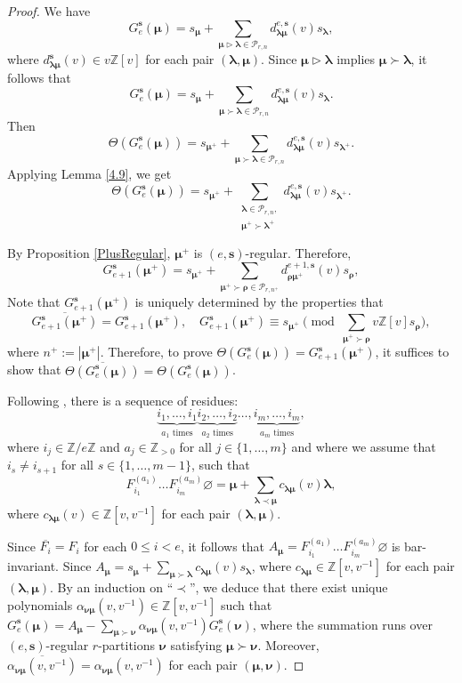 \documentclass[a4paper,10pt]{amsart}
\theoremstyle{plain}
\newcommand{\bvarnothing}{{\boldsymbol \varnothing}}
\def\bs{{\boldsymbol{s}}}
\def\Z{{\mathbb Z}}
\def\PP{\mathscr{P}}
\def\blam{{\boldsymbol \lambda}}
\def\bmu{{\boldsymbol \mu}}
\def\brho{{\boldsymbol\rho}}
\def\bnu{{\boldsymbol \nu}}
\theoremstyle{plain}
\numberwithin{equation}{section}
\begin{document}
\begin{proof} We have $$
G^\bs_e (\bmu) = s_\bmu+\sum_{\bmu\rhd\blam \in \PP_{r,n}} d^{e,\bs}_{\blam \bmu}(v) s_\blam, $$
where $d^\bs_{\blam \bmu} (v) \in v\Z[v]$ for each pair $(\blam,\bmu)$. Since $\bmu\rhd\blam$ implies $\bmu\succ\blam$, it follows that $$
G^\bs_e (\bmu) = s_\bmu+\sum_{\bmu\succ\blam \in \PP_{r,n}} d^{e,\bs}_{\blam \bmu}(v) s_\blam. $$
Then  $$
\varTheta (G^\bs_e(\bmu)) = s_{\bmu^+}+\sum_{\bmu\succ\blam \in \PP_{r,n}} d^{e,\bs}_{\blam \bmu}(v) s_{\blam^+} . $$
Applying Lemma \ref{4.9},  we get $$
\varTheta (G^\bs_e(\bmu)) = s_{\bmu^+}+\sum_{\substack{\blam\in\PP_{r,n},\\ \bmu^+\succ\blam^+}} d^{e,\bs}_{\blam \bmu}(v) s_{\blam^+} . $$

By Proposition \ref{PlusRegular}, $\bmu^+$ is $(e,\bs)$-regular. Therefore, $$
G^\bs_{e+1}(\bmu^+) = s_{\bmu^+} + \sum_{\bmu^+\succ\brho\in \PP_{r,n^+}} d^{e+1,\bs}_{\brho\bmu^+}(v)s_{\brho} ,
$$
Note that $G^\bs_{e+1} (\bmu^+)$ is uniquely determined by the properties that $$
\overline{G^\bs_{e+1} (\bmu^+)} = G^\bs_{e+1}(\bmu^+),\quad G^\bs_{e+1} (\bmu^+)\equiv s_{\bmu^+}\pmod{\sum_{\bmu^+\succ\brho}v\Z[v]s_{\brho}}, $$
where $n^+:=|\bmu^+|$. Therefore, to prove $\varTheta(G_e^\bs (\bmu)) = G^\bs_{e+1}(\bmu^+)$, it suffices to show that $\overline{\varTheta(G_e^\bs (\bmu))}=\varTheta(G_e^\bs (\bmu))$.

Following \cite[10.2]{J}, there is a sequence of residues: $$
\underbrace{{i}_1,\ldots,{i}_{1}}_{a_1\text{ times}}  \underbrace{{i}_2,\ldots,{i}_{2}}_{a_2\text{ times}} \ldots, \underbrace{{i}_m,\ldots,{i}_{m}}_{a_m\text{ times}}, $$
where ${i}_{j}\in \mathbb{Z}/e\mathbb{Z}$ and $a_j\in \mathbb{Z}_{>0}$ for all $j\in \{1,\ldots,m\}$ and where we assume that ${i}_s \neq {i}_{s+1}$ for all $s\in \{1,\ldots,m-1\}$, such that $$
F_{{i}_1}^{(a_1)}\ldots F_{{i}_m}^{(a_m)}\bvarnothing =\bmu + \sum_{\blam\prec\bmu}  c_{\blam \bmu} (v) \blam,$$
where $c_{\blam\bmu} (v)\in\Z[v,v^{-1}]$ for each pair $(\blam,\bmu)$.

Since $\overline{F_i} = F_i$ for each $0\leq i<e$, it follows that $A_\bmu = F_{{i}_1}^{(a_1)} \dots F_{{i}_m}^{(a_m)} \bvarnothing$ is bar-invariant.
Since $A_\bmu=s_\bmu + \sum_{\bmu\succ\blam} c_{\blam \bmu}(v) s_\blam$, where $c_{\blam \bmu} \in \mathbb Z[v, v^{-1}]$ for each pair $(\blam,\bmu)$. By an induction on ``$\prec$'', we deduce that there exist unique polynomials $\alpha_{\bnu \bmu}(v,v^{-1})\in \mathbb Z[v,v^{-1}]$ such that $G^\bs_ e(\bmu)=A_\bmu-\sum_{\bmu\succ\bnu} \alpha_{\bnu \bmu} (v,v^{-1}) G^\bs_e (\bnu)$, where the summation runs over $(e,\bs)$-regular $r$-partitions $\bnu$ satisfying $\bmu\succ\bnu$. Moreover, $\overline{\alpha_{\bnu \bmu} (v,v^{-1})}=\alpha_{\bnu \bmu} (v,v^{-1})$ for each pair $(\bmu,\bnu)$.


\end{proof}
\end{document}
